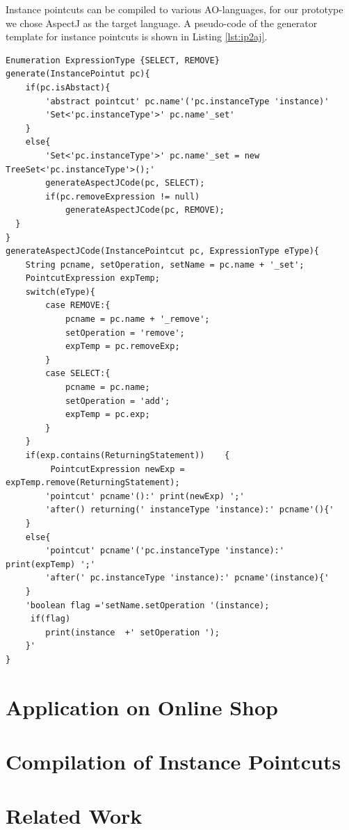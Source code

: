\documentclass{llncs}
\begin{document}
Instance pointcuts can be compiled to various AO-languages, for our prototype we chose AspectJ as the target language. A pseudo-code of the generator template for instance pointcuts is shown in Listing \ref{lst:ip2aj}. 

\begin{lstlisting}[float=H, caption={Code generation templates for instance pointcut to AspectJ generation }, label={lst:ip2aj}]
Enumeration ExpressionType {SELECT, REMOVE}
generate(InstancePointut pc){
	if(pc.isAbstact){
		'abstract pointcut' pc.name'('pc.instanceType 'instance)'
		'Set<'pc.instanceType'>' pc.name'_set'
	}
	else{
		'Set<'pc.instanceType'>' pc.name'_set = new TreeSet<'pc.instanceType'>();'
		generateAspectJCode(pc, SELECT);
		if(pc.removeExpression != null)
			generateAspectJCode(pc, REMOVE);
  }
}	
generateAspectJCode(InstancePointcut pc, ExpressionType eType){
	String pcname, setOperation, setName = pc.name + '_set';
	PointcutExpression expTemp;
	switch(eType){
		case REMOVE:{
			pcname = pc.name + '_remove';
			setOperation = 'remove';
			expTemp = pc.removeExp;
		}
		case SELECT:{
			pcname = pc.name;
			setOperation = 'add';
			expTemp = pc.exp;
		}
	}	
	if(exp.contains(ReturningStatement))	{
		 PointcutExpression newExp = expTemp.remove(ReturningStatement);	
		'pointcut' pcname'():' print(newExp) ';'
		'after() returning(' instanceType 'instance):' pcname'(){'		
	}
	else{
		'pointcut' pcname'('pc.instanceType 'instance):' print(expTemp) ';'
		'after(' pc.instanceType 'instance):' pcname'(instance){'	
	}
	'boolean flag ='setName.setOperation '(instance);
	 if(flag)
		print(instance  +' setOperation ');
	}'
}
\end{lstlisting}

\section{Application on Online Shop}

\section{Compilation of Instance Pointcuts}

\section{Related Work}
\end{document}

